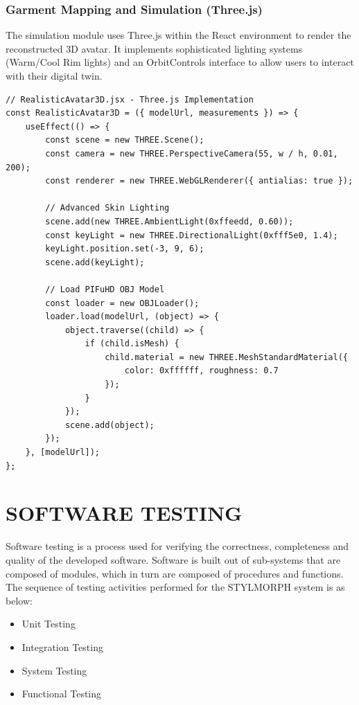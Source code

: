 \documentclass[12pt,a4paper,oneside]{report}
\begin{document}
\subsection{Garment Mapping and Simulation (Three.js)}
The simulation module uses Three.js within the React environment to render the reconstructed 3D avatar. It implements sophisticated lighting systems (Warm/Cool Rim lights) and an OrbitControls interface to allow users to interact with their digital twin.

\begin{verbatim}
// RealisticAvatar3D.jsx - Three.js Implementation
const RealisticAvatar3D = ({ modelUrl, measurements }) => {
    useEffect(() => {
        const scene = new THREE.Scene();
        const camera = new THREE.PerspectiveCamera(55, w / h, 0.01, 200);
        const renderer = new THREE.WebGLRenderer({ antialias: true });
        
        // Advanced Skin Lighting
        scene.add(new THREE.AmbientLight(0xffeedd, 0.60));
        const keyLight = new THREE.DirectionalLight(0xfff5e0, 1.4);
        keyLight.position.set(-3, 9, 6);
        scene.add(keyLight);

        // Load PIFuHD OBJ Model
        const loader = new OBJLoader();
        loader.load(modelUrl, (object) => {
            object.traverse((child) => {
                if (child.isMesh) {
                    child.material = new THREE.MeshStandardMaterial({
                        color: 0xffffff, roughness: 0.7
                    });
                }
            });
            scene.add(object);
        });
    }, [modelUrl]);
};
\end{verbatim}


\chapter{SOFTWARE TESTING}

Software testing is a process used for verifying the correctness, completeness and quality of the developed software. Software is built out of sub-systems that are composed of modules, which in turn are composed of procedures and functions. The sequence of testing activities performed for the STYLMORPH system is as below:

\begin{itemize}
    \item Unit Testing
    \item Integration Testing
    \item System Testing
    \item Functional Testing
\end{itemize}
\end{document}
